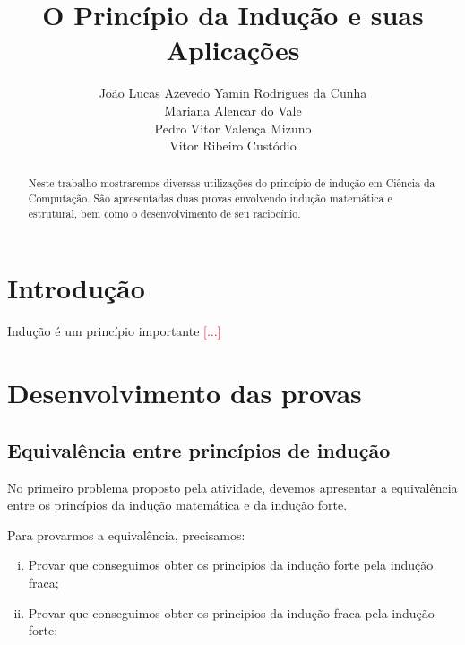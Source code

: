 \documentclass[a4paper, 10pt]{article}
\title{\LARGE \bf
O Princípio da Indução e suas Aplicações
}
\author{João Lucas Azevedo Yamin Rodrigues da Cunha \\
		Mariana Alencar do Vale \\
        Pedro Vitor Valença Mizuno \\
        Vitor Ribeiro Custódio}
\begin{document}
\maketitle

\begin{abstract}

Neste trabalho mostraremos diversas utilizações do princípio de indução em Ciência da Computação. São apresentadas duas provas envolvendo indução matemática e estrutural, bem como o desenvolvimento de seu raciocínio.\par

\end{abstract}

\section{Introdução}

Indução é um princípio importante \textcolor{red}{[...]}

\section{Desenvolvimento das provas}

\subsection{Equivalência entre princípios de indução}


 No primeiro problema proposto pela atividade, devemos apresentar a equivalência entre os princípios da indução matemática e da indução forte. \par \vspace{5mm}

	Para provarmos a equivalência, precisamos:\vspace{5mm}
\begin{enumerate}[i)]
\item Provar que conseguimos obter os principios da indução forte pela indução fraca;
\item Provar que conseguimos obter os principios da indução fraca pela indução forte;
\end{enumerate}
\end{document}
